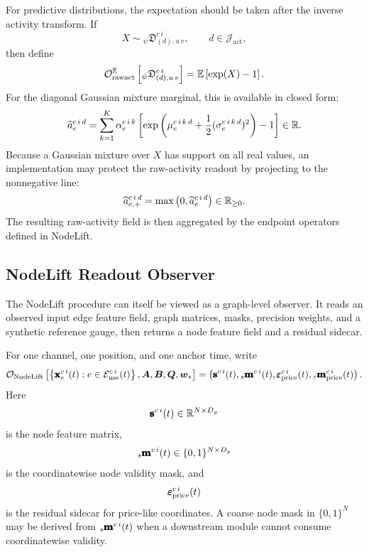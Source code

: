 For predictive distributions, the expectation should be taken after the inverse
activity transform.  If
\[
  X
  \sim
  {}_{\psi}\mathfrak{D}_{(d),u\,v}^{c\,i},
  \qquad
  d\in\mathcal{J}_{\mathrm{act}},
\]
then define
\[
  \mathcal{O}_{\mathrm{rawact}}^{\mathbb{E}}
  \left[
    {}_{\psi}\mathfrak{D}_{(d),u\,v}^{c\,i}
  \right]
  =
  \mathbb{E}
  \left[
    \exp(X)-1
  \right].
\]
For the diagonal Gaussian mixture marginal, this is available in closed form:
\[
  \widehat{a}_{e}^{c\,i\,d}
  =
  \sum_{k=1}^{K}
  \alpha_{e}^{c\,i\,k}
  \left[
    \exp
    \left(
      \mu_{e}^{c\,i\,k\,d}
      +
      \frac{1}{2}
      (\sigma_{e}^{c\,i\,k\,d})^2
    \right)
    -
    1
  \right]
  \in\mathbb{R}.
\]
Because a Gaussian mixture over $X$ has support on all real values, an
implementation may protect the raw-activity readout by projecting to the
nonnegative line:
\[
  \widehat{a}_{e,+}^{c\,i\,d}
  =
  \max
  \left(
    0,
    \widehat{a}_{e}^{c\,i\,d}
  \right)
  \in\mathbb{R}_{\ge 0}.
\]
The resulting raw-activity field is then aggregated by the endpoint operators
defined in NodeLift.

\subsection{NodeLift Readout Observer}
\label{subsec:nodelift-readout-observer}

The NodeLift procedure can itself be viewed as a graph-level observer.  It reads
an observed input edge feature field, graph matrices, masks, precision weights,
and a synthetic reference gauge, then returns a node feature field and a
residual sidecar.

For one channel, one position, and one anchor time, write
\[
  \mathcal{O}_{\mathrm{NodeLift}}
  \left[
    \left\{
      \pmb{\mathbf{x}}_{e}^{c\,i}(t)
      :
      e\in\mathcal{E}_{\mathrm{use}}^{c\,i}(t)
    \right\},
    \bm{A},
    \bm{B},
    \bm{Q},
    \bm{w}_{\star}
  \right]
  =
	  \left(
	    \pmb{\mathbf{s}}^{c\,i}(t),
	    {}_{s}\pmb{\mathbf{m}}^{c\,i}(t),
	    \pmb{\mathbf{\varepsilon}}_{\mathrm{price}}^{c\,i}(t),
	    {}_{\varepsilon}\pmb{\mathbf{m}}_{\mathrm{price}}^{c\,i}(t)
	  \right).
\]
Here
\[
  \pmb{\mathbf{s}}^{c\,i}(t)
  \in
  \mathbb{R}^{N\times D_y}
\]
is the node feature matrix,
\[
  {}_{s}\pmb{\mathbf{m}}^{c\,i}(t)
  \in
  \{0,1\}^{N\times D_y}
\]
is the coordinatewise node validity mask, and
\[
  \pmb{\mathbf{\varepsilon}}_{\mathrm{price}}^{c\,i}(t)
\]
is the residual sidecar for price-like coordinates.  A coarse node mask in
$\{0,1\}^{N}$ may be derived from ${}_{s}\pmb{\mathbf{m}}^{c\,i}(t)$ when a downstream
module cannot consume coordinatewise validity.

